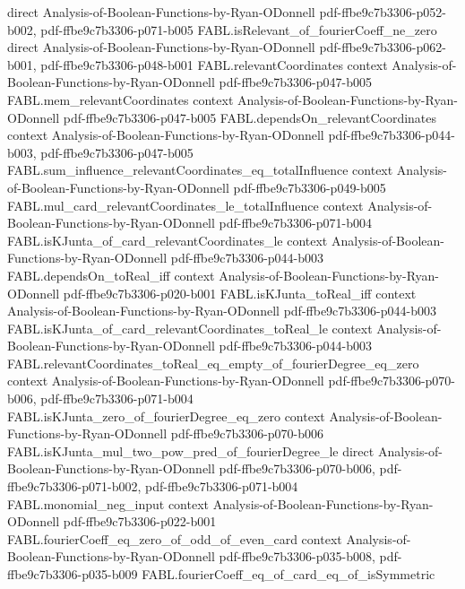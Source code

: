 \begin{theorem}
  {direct}
  {Analysis-of-Boolean-Functions-by-Ryan-ODonnell}
  {pdf-ffbe9c7b3306-p052-b002,
    pdf-ffbe9c7b3306-p071-b005}
\proofstep
  {FABL.isRelevant_of_fourierCoeff_ne_zero}
  {direct}
  {Analysis-of-Boolean-Functions-by-Ryan-ODonnell}
  {pdf-ffbe9c7b3306-p062-b001,
    pdf-ffbe9c7b3306-p048-b001}
\proofstep
  {FABL.relevantCoordinates}
  {context}
  {Analysis-of-Boolean-Functions-by-Ryan-ODonnell}
  {pdf-ffbe9c7b3306-p047-b005}
\proofstep
  {FABL.mem_relevantCoordinates}
  {context}
  {Analysis-of-Boolean-Functions-by-Ryan-ODonnell}
  {pdf-ffbe9c7b3306-p047-b005}
\proofstep
  {FABL.dependsOn_relevantCoordinates}
  {context}
  {Analysis-of-Boolean-Functions-by-Ryan-ODonnell}
  {pdf-ffbe9c7b3306-p044-b003,
    pdf-ffbe9c7b3306-p047-b005}
\proofstep
  {FABL.sum_influence_relevantCoordinates_eq_totalInfluence}
  {context}
  {Analysis-of-Boolean-Functions-by-Ryan-ODonnell}
  {pdf-ffbe9c7b3306-p049-b005}
\proofstep
  {FABL.mul_card_relevantCoordinates_le_totalInfluence}
  {context}
  {Analysis-of-Boolean-Functions-by-Ryan-ODonnell}
  {pdf-ffbe9c7b3306-p071-b004}
\proofstep
  {FABL.isKJunta_of_card_relevantCoordinates_le}
  {context}
  {Analysis-of-Boolean-Functions-by-Ryan-ODonnell}
  {pdf-ffbe9c7b3306-p044-b003}
\proofstep
  {FABL.dependsOn_toReal_iff}
  {context}
  {Analysis-of-Boolean-Functions-by-Ryan-ODonnell}
  {pdf-ffbe9c7b3306-p020-b001}
\proofstep
  {FABL.isKJunta_toReal_iff}
  {context}
  {Analysis-of-Boolean-Functions-by-Ryan-ODonnell}
  {pdf-ffbe9c7b3306-p044-b003}
\proofstep
  {FABL.isKJunta_of_card_relevantCoordinates_toReal_le}
  {context}
  {Analysis-of-Boolean-Functions-by-Ryan-ODonnell}
  {pdf-ffbe9c7b3306-p044-b003}
\proofstep
  {FABL.relevantCoordinates_toReal_eq_empty_of_fourierDegree_eq_zero}
  {context}
  {Analysis-of-Boolean-Functions-by-Ryan-ODonnell}
  {pdf-ffbe9c7b3306-p070-b006,
    pdf-ffbe9c7b3306-p071-b004}
\proofstep
  {FABL.isKJunta_zero_of_fourierDegree_eq_zero}
  {context}
  {Analysis-of-Boolean-Functions-by-Ryan-ODonnell}
  {pdf-ffbe9c7b3306-p070-b006}
\proofstep
  {FABL.isKJunta_mul_two_pow_pred_of_fourierDegree_le}
  {direct}
  {Analysis-of-Boolean-Functions-by-Ryan-ODonnell}
  {pdf-ffbe9c7b3306-p070-b006,
    pdf-ffbe9c7b3306-p071-b002,
    pdf-ffbe9c7b3306-p071-b004}
\proofstep
  {FABL.monomial_neg_input}
  {context}
  {Analysis-of-Boolean-Functions-by-Ryan-ODonnell}
  {pdf-ffbe9c7b3306-p022-b001}
\proofstep
  {FABL.fourierCoeff_eq_zero_of_odd_of_even_card}
  {context}
  {Analysis-of-Boolean-Functions-by-Ryan-ODonnell}
  {pdf-ffbe9c7b3306-p035-b008,
    pdf-ffbe9c7b3306-p035-b009}
\proofstep
  {FABL.fourierCoeff_eq_of_card_eq_of_isSymmetric}

\end{theorem}
